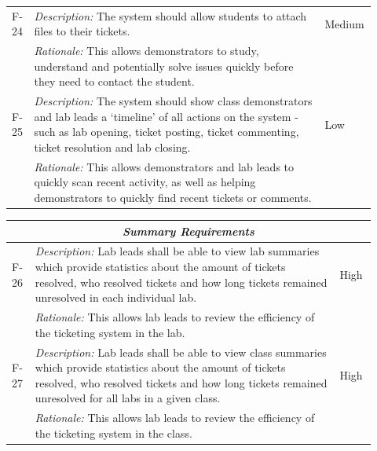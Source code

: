 \begin{table}[H]
\begin{tabular}{|p{0.05\linewidth} | p{0.78\linewidth} |p{0.09\linewidth}|}
      \hline\hline
 F-24 & \textit{Description:} The system should allow students to attach files to their tickets. & Medium\\
  \cline{2-2}
  & \textit{Rationale:} This allows demonstrators to study, understand and potentially solve issues quickly before they need to contact the student. & \\
  
        \hline\hline
 F-25 & \textit{Description:} The system should show class demonstrators and lab leads a `timeline' of all actions on the system - such as lab opening, ticket posting, ticket commenting, ticket resolution and lab closing. & Low\\
  \cline{2-2}
  & \textit{Rationale:} This allows demonstrators and lab leads to quickly scan recent activity, as well as helping demonstrators to quickly find recent tickets or comments. & \\
  \hline
 
 \end{tabular}
\end{table}
 
 \begin{table}[H]
\small
\begin{tabular}{|p{0.05\linewidth} | p{0.78\linewidth} |p{0.09\linewidth}|}
 
  \multicolumn{3}{c}{\textit{\textbf{Summary Requirements}}}\\
 
 \hline
 F-26 & \textit{Description:} Lab leads shall be able to view lab summaries which provide statistics about the amount of tickets resolved, who resolved tickets and how long tickets remained unresolved in each individual lab. & High\\
  \cline{2-2}
  & \textit{Rationale:} This allows lab leads to review the efficiency of the ticketing system in the lab. & \\

 \hline\hline
 F-27 & \textit{Description:} Lab leads shall be able to view class summaries which provide statistics about the amount of tickets resolved, who resolved tickets and how long tickets remained unresolved for all labs in a given class. & High\\
  \cline{2-2}
  & \textit{Rationale:} This allows lab leads to review the efficiency of the ticketing system in the class. & \\
  \hline
  
\end{tabular}
\end{table}

